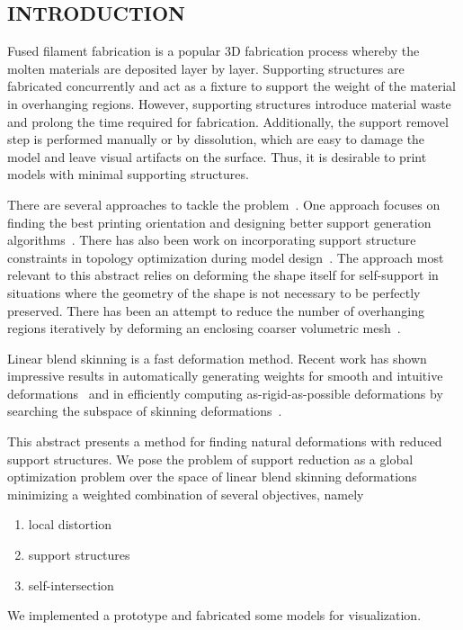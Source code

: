 
\subsection*{INTRODUCTION}

Fused filament fabrication is a popular 3D fabrication process whereby the molten materials are deposited layer by layer. Supporting structures are fabricated concurrently and act as a fixture to support the weight of the material in overhanging regions. However, supporting structures introduce material waste and prolong the time required for fabrication. Additionally, the support removel step is performed manually or by dissolution, which are easy to damage the model and leave visual artifacts on the surface. Thus, it is desirable to print models with minimal supporting structures.

There are several approaches to tackle the problem~\cite{jiang_xu_stringer_2018}. One approach focuses on finding the best printing orientation and designing better support generation algorithms~\cite{vanek_galicia_benes_2014}. There has also been work on incorporating support structure constraints in topology optimization during model design~\cite{langelaar_2016}. The approach most relevant to this abstract relies on deforming the shape itself for self-support in situations where the geometry of the shape is not necessary to be perfectly preserved. There has been an attempt to reduce the number of overhanging regions iteratively by deforming an enclosing coarser volumetric mesh~\cite{hu_jin_wang_2015}.

Linear blend skinning is a fast deformation method. Recent work has shown impressive results in automatically generating weights for smooth and intuitive deformations~\cite{jacobson_bounded_biharmonic_weights_2011} and in efficiently computing as-rigid-as-possible deformations by searching the subspace of skinning deformations~\cite{jacobson_fast_2012}.

This abstract presents a method for finding natural deformations with reduced support structures. We pose the problem of support reduction as a global optimization problem over the space of linear blend skinning deformations minimizing a weighted combination of several objectives, namely
\begin{enumerate}
    \item local distortion ~\cite{sorkine_arap_2007}
    \item support structures
    \item self-intersection
\end{enumerate}
We implemented a prototype and fabricated some models for visualization.

